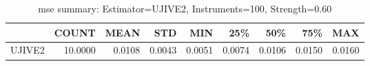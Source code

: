 \begin{table}[ht]
\centering
\caption{mse summary: Estimator=UJIVE2, Instruments=100, Strength=0.60}
\begin{tabular}{lrrrrrrrr}
\toprule
 & COUNT & MEAN & STD & MIN & 25\% & 50\% & 75\% & MAX \\
\midrule
UJIVE2 & 10.0000 & 0.0108 & 0.0043 & 0.0051 & 0.0074 & 0.0106 & 0.0150 & 0.0160 \\
\bottomrule
\end{tabular}
\end{table}
